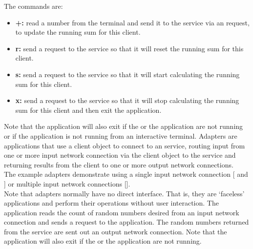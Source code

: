 The commands are:
\begin{itemize}
\item \textbf{+:} read a number from the terminal and send it to the service via an
 request, to update the running sum for this
client.
\item \textbf{r:} send a  request to the
service so that it will reset the running sum for this client.
\item \textbf{s:} send a  request to the
service so that it will start calculating the running sum for this client.
\item \textbf{x:} send a  request to the
service so that it will stop calculating the running sum for this client and then exit the
application.
\end{itemize}
Note that the application will also exit if the
 or the
 application are not running or if the
application is not running from an interactive terminal.
\secondaryEnd{}
Adapters are applications that use a client object to connect to an \mplusm{} service,
routing input from one or more input \yarp{} network connection via the client object to
the service and returning results from the client to one or more output \yarp{} network
connections.\\

The example adapters demonstrate using a single input \yarp{} network connection
[ and
] or multiple input \yarp{} network
connections [].\\

Note that adapters normally have no direct interface.
That is, they are `faceless' applications and perform their operations without user
interaction.
The  application reads the count of
random numbers desired from an input \yarp{} network connection and sends a
 request to the
 application.
The random numbers returned from the service are sent out an output \yarp{} network
connection.
Note that the application will also exit if the
 or the
 application are not running.

